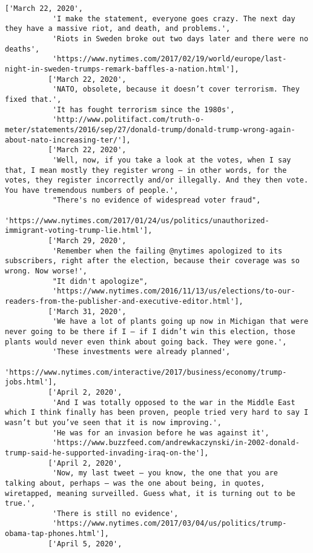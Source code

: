 \documentclass[11pt]{article}
\begin{document}
\begin{Verbatim}[commandchars=\\\{\}]
          ['March 22, 2020',
           'I make the statement, everyone goes crazy. The next day they have a massive riot, and death, and problems.',
           'Riots in Sweden broke out two days later and there were no deaths',
           'https://www.nytimes.com/2017/02/19/world/europe/last-night-in-sweden-trumps-remark-baffles-a-nation.html'],
          ['March 22, 2020',
           'NATO, obsolete, because it doesn’t cover terrorism. They fixed that.',
           'It has fought terrorism since the 1980s',
           'http://www.politifact.com/truth-o-meter/statements/2016/sep/27/donald-trump/donald-trump-wrong-again-about-nato-increasing-ter/'],
          ['March 22, 2020',
           'Well, now, if you take a look at the votes, when I say that, I mean mostly they register wrong — in other words, for the votes, they register incorrectly and/or illegally. And they then vote. You have tremendous numbers of people.',
           "There's no evidence of widespread voter fraud",
           'https://www.nytimes.com/2017/01/24/us/politics/unauthorized-immigrant-voting-trump-lie.html'],
          ['March 29, 2020',
           'Remember when the failing @nytimes apologized to its subscribers, right after the election, because their coverage was so wrong. Now worse!',
           "It didn't apologize",
           'https://www.nytimes.com/2016/11/13/us/elections/to-our-readers-from-the-publisher-and-executive-editor.html'],
          ['March 31, 2020',
           'We have a lot of plants going up now in Michigan that were never going to be there if I — if I didn’t win this election, those plants would never even think about going back. They were gone.',
           'These investments were already planned',
           'https://www.nytimes.com/interactive/2017/business/economy/trump-jobs.html'],
          ['April 2, 2020',
           'And I was totally opposed to the war in the Middle East which I think finally has been proven, people tried very hard to say I wasn’t but you’ve seen that it is now improving.',
           'He was for an invasion before he was against it',
           'https://www.buzzfeed.com/andrewkaczynski/in-2002-donald-trump-said-he-supported-invading-iraq-on-the'],
          ['April 2, 2020',
           'Now, my last tweet — you know, the one that you are talking about, perhaps — was the one about being, in quotes, wiretapped, meaning surveilled. Guess what, it is turning out to be true.',
           'There is still no evidence',
           'https://www.nytimes.com/2017/03/04/us/politics/trump-obama-tap-phones.html'],
          ['April 5, 2020',

\end{Verbatim}
\end{document}
